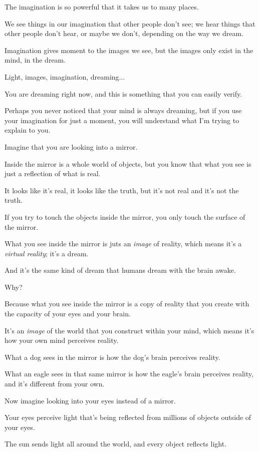 \documentclass{article}
\numberwithin{equation}{section}
\begin{document}
The imagination is so powerful that it takes us to many places.

We see things in our imagination that other people don't see; we hear things that other people don't hear, or maybe we don't, depending on the way we dream.

Imagination gives moment to the images we see, but the images only exist in the mind, in the dream.

%
Light, images, imagination, dreaming$\ldots$

You are dreaming right now, and this is something that you can easily verify.

Perhaps you never noticed that your mind is always dreaming, but if you use your imagination for just a moment, you will understand what I'm trying to explain to you.

Imagine that you are looking into a mirror.

Inside the mirror is a whole world of objects, but you know that what you see is just a reflection of what is real.

It looks like it's real, it looks like the truth, but it's not real and it's not the truth.

If you try to touch the objects inside the mirror, you only touch the surface of the mirror.

%
What you see inside the mirror is juts an \textit{image} of reality, which means it's a \textit{virtual reality}; it's a dream.

And it's the same kind of dream that humans dream with the brain awake.

Why?

Because what you see inside the mirror is a copy of reality that you create with the capacity of your eyes and your brain.

It's an \textit{image} of the world that you construct within your mind, which means it's how your own mind perceives reality.

What a dog sees in the mirror is how the dog's brain perceives reality.

What an eagle sees in that same mirror is how the eagle's brain perceives reality, and it's different from your own.

%
Now imagine looking into your eyes instead of a mirror.

Your eyes perceive light that's being reflected from millions of objects outside of your eyes.

The sun sends light all around the world, and every object reflects light.
\end{document}
